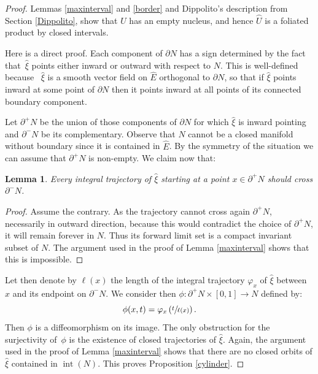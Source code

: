 \documentclass[JEP,XML,SOM,Unicode]{cedram}
\DeclareMathOperator{\inte}{int}
\newtheorem{lemma}[theorem]{Lemma}
\theoremstyle{definition}
\theoremstyle{remark}
\numberwithin{equation}{section}
\begin{document}
\begin{proof}
Lemmas \ref{maxinterval} and \ref{border} and Dippolito's description from Section \ref{Dippolito},
show that $U$ has an empty nucleus, and hence $\wideparen{U}$ is a foliated product by closed intervals.

Here is a direct proof.
Each component of $\partial N$ has a sign determined by
the fact that~$\widehat{\xi}$ points either inward or outward with respect to $N$.
This is well-defined because~ $\widehat{\xi}$ is a smooth vector field on $\widehat{E}$
orthogonal to $\partial N$, so that if $\widehat{\xi}$ points inward at some point of
$\partial N$ then it points inward at all points of its connected boundary component.

Let $\partial^+ N$ be the union of those components of
$\partial N$ for which
$\widehat{\xi}$ is inward pointing and $\partial^- N$ be its complementary.
Observe that $N$ cannot be a closed manifold without boundary since it is
contained in $\widehat{E}$. By the symmetry of the situation we can assume that
$\partial^+ N$ is non-empty.
We claim now that:
\begin{lemma}
Every integral trajectory of $\widehat{\xi}$ starting at a point
$x\in \partial^+ N$ should cross $\partial^- N$.
\end{lemma}
\begin{proof}
Assume the contrary.
As the trajectory cannot cross again $\partial^+ N$,
necessarily in outward direction, because this would contradict the choice of
$\partial^+ N$, it will remain forever in $N$.
Thus its forward limit set is a
compact invariant subset of $N$. The argument used in the proof of Lemma \ref{maxinterval} shows that this is impossible.
\end{proof}

Let then denote by $\ell(x)$ the length of the integral trajectory $\varphi_x$
of $\widehat{\xi}$ between $x$ and its endpoint on $\partial^- N$.
We consider then $\phi: \partial^+ N\times [0,1]\to N$
defined by:
\[ \phi(x,t)= \varphi_x\left(\sfrac{t}{\ell(x)}\right).\]
Then $\phi$ is a diffeomorphism on its image.
The only obstruction for the surjectivity of~$\phi$
is the existence of closed trajectories of $\widehat{\xi}$.
Again, the argument used in the proof of Lemma \ref{maxinterval} shows that
there are no closed orbits of $\widehat{\xi}$ contained in $\inte (N)$.
This proves Proposition \ref{cylinder}.
\end{proof}
\end{document}
